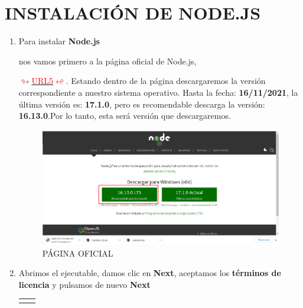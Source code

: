 \section{INSTALACIÓN DE NODE.JS}
\begin{enumerate}
    \item \hypertarget{instalarnode}{Para instalar \textbf{Node.js}} nos vamos primero a la página oficial de Node.js,\begin{minipage}[c]{0,17 \textwidth}
 \href{https://nodejs.org/es/}{
 \def\svgwidth{0.9\textwidth}
 } 
 \end{minipage}\newline \hyperlink{node1}{\textcolor{red}{$\looparrowright$URL5$\looparrowleft$}}. Estando dentro de la página descargaremos la versión correspondiente a nuestro sistema operativo. Hasta la fecha:\textbf{ 16/11/2021}, la última versión es:\textbf{ 17.1.0}, pero es recomendable descarga la versión: \textbf{ 16.13.0}.Por lo tanto, esta será versión que descargaremos.
    \begin{figure}[H]
    \centering
    \includegraphics[width = 14 cm]{img/nodepagina.png}
    \caption{PÁGINA OFICIAL}
    \end{figure}
    \newpage
    \item Abrimos el ejecutable, damos clic en \textbf{Next}, 
    aceptamos los \textbf{términos de licencia} \newline y pulsamos de nuevo \textbf{Next}
\begin{center}
\begin{tabular}{p{6cm} p{6cm}}
\begin{minipage}[c]{6cm}
\centering

\end{minipage}
\end{tabular}
\end{center}
\end{enumerate}
